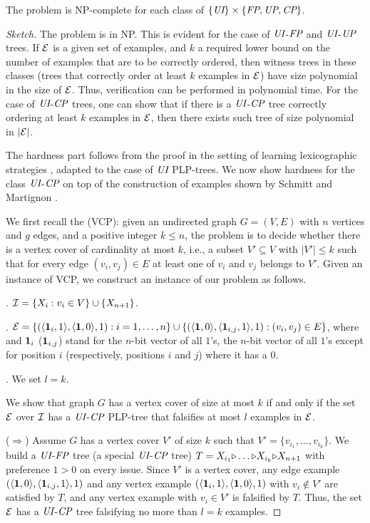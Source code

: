 \begin{thm}
\label{thm:UIFP_least_decision}
The  problem is NP-complete for each class of $\{\textit{UI}\} \times \{\textit{FP},\textit{UP},\textit{CP}\}$.
\end{thm}
\begin{proof}[Sketch]
The problem is in NP. This is evident for the case
of $\textit{UI}$-$\textit{FP}$ and $\textit{UI}$-$\textit{UP}$ trees. If $\mathcal{E}$ is a given set of examples,
and $k$ a required lower bound on the number of examples that are to be 
correctly ordered, then witness trees in these classes (trees that correctly 
order at least $k$ examples in $\mathcal{E}$) have size polynomial in the size of 
$\mathcal{E}$. Thus, verification can be performed in polynomial time. 
For the case of $\textit{UI}$-$\textit{CP}$ trees, one can show that if there is a $\textit{UI}$-$\textit{CP}$
tree correctly ordering at least $k$ examples in $\mathcal{E}$, then there exists
such tree of size polynomial in $|\mathcal{E}|$.

The hardness part follows from the proof in the setting of learning 
lexicographic strategies \cite{schmitt2006complexity}, adapted to the case 
of $\textit{UI}$ PLP-trees.
We now show hardness for the class $\textit{UI}$-$\textit{CP}$ on top of the construction
of examples shown by Schmitt and Martignon .

We first recall the  (VCP): 
given an undirected graph $G=(V,E)$ with
$n$ vertices and $g$ edges, and a positive integer $k\leq n$, the problem is to
decide whether there is a vertex cover of cardinality at most $k$, i.e.,
a subset $V' \subseteq V$ with $|V'|\leq k$ such that for every edge 
$(v_i,v_j) \in E$ at least one of $v_i$ and $v_j$ belongs to $V'$.
Given an instance of VCP, we construct an instance of our problem as follows.

. $\mathcal{I}=\{X_i:v_i \in V\} \cup \{X_{n+1}\}$.

. $\mathcal{E}=\{(\mathit{\langle} \textbf{1}_i,1 \mathit{\rangle}, \mathit{\langle} \textbf{1},0 \mathit{\rangle}, 1): i=1,\ldots,n\}
\cup \{(\mathit{\langle} \textbf{1},0 \mathit{\rangle}, \mathit{\langle} \textbf{1}_{i,j},1 \mathit{\rangle}, 1): (v_i,v_j) \in E\}$,
where  and $\textbf{1}_i$ ($\textbf{1}_{i,j}$) stand for
the $n$-bit vector of all $1$'s, the $n$-bit vector of all $1$'s except 
for position $i$ (respectively, positions $i$ and $j$) where it has a $0$.

. We set $l=k$.

We show that graph $G$ has a vertex cover of size at most $k$ if and only if
the set $\mathcal{E}$ over $\mathcal{I}$ has a $\textit{UI}$-$\textit{CP}$ PLP-tree that falsifies at
most $l$ examples in $\mathcal{E}$.

\noindent ($\Rightarrow$) Assume $G$ has a vertex cover $V'$ of size $k$ such that
$V'=\{v_{i_1},\ldots,v_{i_k}\}$. We build a $\textit{UI}$-$\textit{FP}$ tree (a special $\textit{UI}$-$\textit{CP}$ tree)
$T=X_{i_1} \mathit{\triangleright} \ldots \mathit{\triangleright} X_{i_k} \mathit{\triangleright} X_{n+1}$ with preference $1>0$ on every issue.
Since $V'$ is a vertex cover, any edge example $(\mathit{\langle} \textbf{1},0 \mathit{\rangle}, \mathit{\langle} \textbf{1}_{i,j},1 \mathit{\rangle}, 1)$
and any vertex example $(\mathit{\langle} \textbf{1}_i,1 \mathit{\rangle}, \mathit{\langle} \textbf{1},0 \mathit{\rangle}, 1)$ with
$v_i \not \in V'$ are satisfied by $T$, and any vertex example with $v_i \in V'$
is falsified by $T$.  Thus, the set $\mathcal{E}$ has a $\textit{UI}$-$\textit{CP}$ tree falsifying no more than
$l=k$ examples.


\end{proof}

